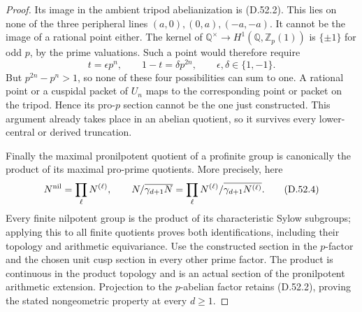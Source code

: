 \begin{proof}
Its image in the ambient tripod
abelianization is (D.52.2).
This lies on none of the three
peripheral lines
\((a,0),(0,a),(-a,-a)\).
It cannot be the image of a rational
point either. The kernel of
\(\mathbb Q^\times\to
H^1(\mathbb Q,\mathbb Z_p(1))\)
is \(\{\pm1\}\) for odd \(p\), by
the prime valuations. Such a point
would therefore require
\[
       t=\epsilon p^n,\qquad
       1-t=\delta p^{2n},\qquad
       \epsilon,\delta\in\{1,-1\}.
 \]
But \(p^{2n}-p^n>1\), so none of
these four possibilities can sum
to one. A rational point or a
cuspidal packet of \(U_n\) maps
to the corresponding point or
packet on the tripod. Hence its
pro-\(p\) section cannot be the
one just constructed. This argument
already takes place in an abelian
quotient, so it survives every
lower-central or derived truncation.

Finally the maximal pronilpotent
quotient of a profinite group is
canonically the product of its
maximal pro-prime quotients. More
precisely, here
\[
 N^{\rm nil}=\prod_\ell N^{(\ell)},
 \qquad
 N/\overline{\gamma_{d+1}N}
   =\prod_\ell
       N^{(\ell)}/\overline{\gamma_{d+1}N^{(\ell)}} .
                                                               \tag{D.52.4}
\]
Every finite nilpotent group is the
product of its characteristic Sylow
subgroups; applying this to all finite
quotients proves both identifications,
including their topology and arithmetic
equivariance. Use the constructed
section in the \(p\)-factor and the
chosen unit cusp section in every
other prime factor. The product is
continuous in the product topology
and is an actual section of the
pronilpotent arithmetic extension.
Projection to the \(p\)-abelian
factor retains (D.52.2), proving
the stated nongeometric property
at every \(d\ge1\).
\end{proof}


